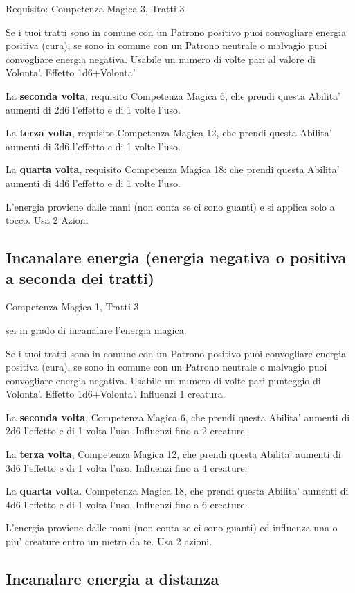 \documentclass[a4paper,11pt,twoside,openany]{dndbook}
\begin{document}
Requisito: Competenza Magica 3, Tratti 3

Se i tuoi tratti sono in comune con un Patrono positivo puoi convogliare energia positiva (cura), se sono in comune con un Patrono neutrale o malvagio puoi convogliare energia negativa. Usabile un numero di volte pari al valore di Volonta'. Effetto 1d6+Volonta'

La \textbf{seconda volta}, requisito Competenza Magica 6, che prendi questa Abilita' aumenti di 2d6 l'effetto e di 1 volte l'uso.

La \textbf{terza volta}, requisito Competenza Magica 12, che prendi questa Abilita' aumenti di 3d6 l'effetto e di 1 volte l'uso.

La \textbf{quarta volta}, requisito Competenza Magica 18: che prendi questa Abilita' aumenti di 4d6 l'effetto e di 1 volte l'uso.

L'energia proviene dalle mani (non conta se ci sono guanti) e si applica solo a tocco. Usa 2 Azioni

\subsection{Incanalare energia (energia negativa o positiva a seconda dei tratti)}

Competenza Magica 1, Tratti 3

sei in grado di incanalare l'energia magica.

Se i tuoi tratti sono in comune con un Patrono positivo puoi convogliare energia positiva (cura), se sono in comune con un Patrono neutrale o malvagio puoi convogliare energia negativa. Usabile un numero di volte pari punteggio di Volonta'. Effetto 1d6+Volonta'. Influenzi 1 creatura.

La \textbf{seconda volta}, Competenza Magica 6, che prendi questa Abilita' aumenti di 2d6 l'effetto e di 1 volta l'uso. Influenzi fino a 2 creature.

La \textbf{terza volta}, Competenza Magica 12, che prendi questa Abilita' aumenti di 3d6 l'effetto e di 1 volta l'uso. Influenzi fino a 4 creature.

La \textbf{quarta volta}. Competenza Magica 18, che prendi questa Abilita' aumenti di 4d6 l'effetto e di 1 volta l'uso. Influenzi fino a 6 creature.

L'energia proviene dalle mani (non conta se ci sono guanti) ed influenza una o piu' creature entro un metro da te. Usa 2 azioni.

\subsection{Incanalare energia a distanza}
\end{document}
